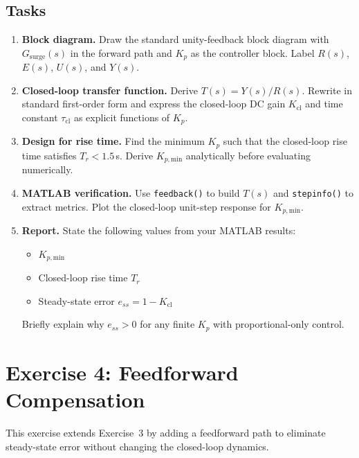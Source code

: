 \documentclass[11pt]{article}
\begin{document}
\subsection*{Tasks}

\begin{enumerate}

\item \textbf{Block diagram.}
  Draw the standard unity-feedback block diagram with $G_{\mathrm{surge}}(s)$
  in the forward path and $K_p$ as the controller block.
  Label $R(s)$, $E(s)$, $U(s)$, and $Y(s)$.

\item \textbf{Closed-loop transfer function.}
  Derive $T(s) = Y(s)/R(s)$.  Rewrite in standard first-order form and express
  the closed-loop DC gain $K_{\mathrm{cl}}$ and time constant $\tau_{\mathrm{cl}}$
  as explicit functions of $K_p$.

\item \textbf{Design for rise time.}
  Find the minimum $K_p$ such that the closed-loop rise time satisfies
  $T_r < 1.5$\,s.  Derive $K_{p,\mathrm{min}}$ analytically before evaluating
  numerically.

\item \textbf{MATLAB verification.}
  Use \texttt{feedback()} to build $T(s)$ and \texttt{stepinfo()} to extract
  metrics.  Plot the closed-loop unit-step response for $K_{p,\mathrm{min}}$.

\item \textbf{Report.}
  State the following values from your MATLAB results:
  \begin{itemize}
    \item $K_{p,\mathrm{min}}$
    \item Closed-loop rise time $T_r$
    \item Steady-state error $e_{ss} = 1 - K_{\mathrm{cl}}$
  \end{itemize}
  Briefly explain why $e_{ss} > 0$ for any finite $K_p$ with proportional-only
  control.

\end{enumerate}

\section*{Exercise 4: Feedforward Compensation}

This exercise extends Exercise~3 by adding a feedforward path to eliminate
steady-state error without changing the closed-loop dynamics.
\end{document}
